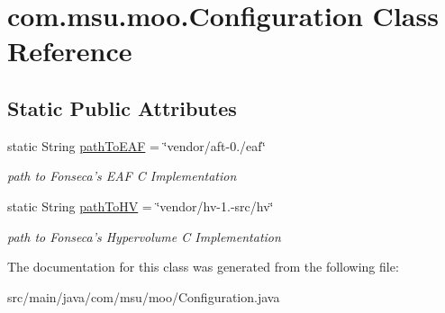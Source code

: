 \hypertarget{classcom_1_1msu_1_1moo_1_1Configuration}{\section{com.\-msu.\-moo.\-Configuration Class Reference}
\label{classcom_1_1msu_1_1moo_1_1Configuration}
}
\subsection*{Static Public Attributes}
\begin{DoxyCompactItemize}
\item 
\hypertarget{classcom_1_1msu_1_1moo_1_1Configuration_a2750209761c81fda824cafb4ad0bf198}{static String \hyperlink{classcom_1_1msu_1_1moo_1_1Configuration_a2750209761c81fda824cafb4ad0bf198}{path\-To\-E\-A\-F} = \char`\"{}vendor/aft-\/0./eaf\char`\"{}}\label{classcom_1_1msu_1_1moo_1_1Configuration_a2750209761c81fda824cafb4ad0bf198}

\begin{DoxyCompactList}\small\item\em path to Fonseca's E\-A\-F C Implementation \end{DoxyCompactList}\item 
\hypertarget{classcom_1_1msu_1_1moo_1_1Configuration_a312152f3e35cc90f11345a3be3b64231}{static String \hyperlink{classcom_1_1msu_1_1moo_1_1Configuration_a312152f3e35cc90f11345a3be3b64231}{path\-To\-H\-V} = \char`\"{}vendor/hv-\/1.-\/src/hv\char`\"{}}\label{classcom_1_1msu_1_1moo_1_1Configuration_a312152f3e35cc90f11345a3be3b64231}

\begin{DoxyCompactList}\small\item\em path to Fonseca's Hypervolume C Implementation \end{DoxyCompactList}\end{DoxyCompactItemize}


The documentation for this class was generated from the following file\-:\begin{DoxyCompactItemize}
\item 
src/main/java/com/msu/moo/Configuration.\-java\end{DoxyCompactItemize}
